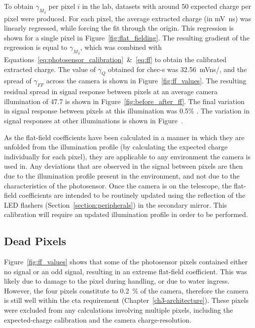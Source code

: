 To obtain ${\gamma_M}_i$ per pixel $i$ in the lab, datasets with around \SI{50}{\pe} expected charge per pixel were produced. For each pixel, the average extracted charge (in \si{mV ns}) was linearly regressed, while forcing the fit through the origin. This regression is shown for a single pixel in Figure~\ref{fig:flat_fielding}. The resulting gradient of the regression is equal to ${\gamma_M}_i$, which was combined with Equations~\ref{eq:photosensor_calibration}~\&~\ref{eq:ff} to obtain the calibrated extracted charge. The value of $\gamma_Q$ obtained for \gls{chec-s} was \SI{32.56}{mVns/\pe}, and the spread of $\gamma_{FF}$ across the camera is shown in Figure~\ref{fig:ff_values}. The resulting residual spread in signal response between pixels at an average camera illumination of \SI{47.7}{\pe} is shown in Figure~\ref{fig:before_after_ff}. The final variation in signal response between pixels at this illumination was 0.5\% . The variation in signal responses at other illuminations is shown in Figure~.

As the flat-field coefficients have been calculated in a manner in which they are unfolded from the illumination profile (by calculating the expected charge individually for each pixel), they are applicable to any environment the camera is used in. Any deviations that are observed in the signal between pixels are then due to the illumination profile present in the environment, and not due to the characteristics of the photosensor. Once the camera is on the telescope, the flat-field coefficients are intended to be routinely updated using the reflection of the LED flashers (Section~\ref{section:peripherals}) in the secondary mirror. This calibration will require an updated illumination profile in order to be performed.

\subsection{Dead Pixels}

Figure~\ref{fig:ff_values} shows that some of the photosensor pixels contained either no signal or an odd signal, resulting in an extreme flat-field coefficient. This was likely due to damage to the pixel during handling, or due to water ingress. However, the four pixels constitute to \SI{0.2}{\percent} of the camera, therefore the camera is still well within the  \gls{cta} requirement (Chapter~\ref{ch3-architecture}). These pixels were excluded from any calculations involving multiple pixels, including the expected-charge calibration and the camera charge-resolution. 

